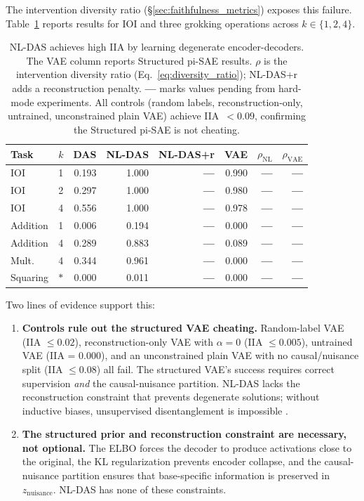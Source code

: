 \documentclass{article}
\begin{document}
The intervention diversity ratio (\S\ref{sec:faithfulness_metrics}) exposes this
failure. Table~\ref{tab:nldas_vacuous} reports results for IOI and three
grokking operations across $k \in \{1, 2, 4\}$.

\begin{table}[t]
\centering
\small
\setlength{\tabcolsep}{3pt}
\begin{tabular}{lc rrrr rr}
\toprule
Task & $k$ & DAS & NL-DAS & NL-DAS+r & VAE & $\rho_\text{NL}$ & $\rho_\text{VAE}$ \\
\midrule
IOI & 1 & 0.193 & 1.000 & \textbf{---} & 0.990 & \textbf{---} & \textbf{---} \\
IOI & 2 & 0.297 & 1.000 & \textbf{---} & 0.980 & \textbf{---} & \textbf{---} \\
IOI & 4 & 0.556 & 1.000 & \textbf{---} & 0.978 & \textbf{---} & \textbf{---} \\
Addition & 1 & 0.006 & 0.194 & \textbf{---} & 0.000 & \textbf{---} & \textbf{---} \\
Addition & 4 & 0.289 & 0.883 & \textbf{---} & 0.089 & \textbf{---} & \textbf{---} \\
Mult.\ & 4 & 0.344 & 0.961 & \textbf{---} & 0.000 & \textbf{---} & \textbf{---} \\
Squaring & $*$ & 0.000 & 0.011 & \textbf{---} & 0.000 & \textbf{---} & \textbf{---} \\
\bottomrule
\end{tabular}
\caption{NL-DAS achieves high IIA by learning degenerate encoder-decoders.
  The VAE column reports Structured pi-SAE results.
  $\rho$ is the intervention diversity ratio (Eq.~\ref{eq:diversity_ratio});
  NL-DAS+r adds a reconstruction penalty.
  \textbf{---} marks values pending from hard-mode experiments.
  All controls (random labels, reconstruction-only, untrained, unconstrained
  plain VAE) achieve IIA~$< 0.09$, confirming the Structured pi-SAE is not
  cheating.}
\label{tab:nldas_vacuous}
\end{table}

Two lines of evidence support this:

\begin{enumerate}[leftmargin=*]
\item \textbf{Controls rule out the structured VAE cheating.} Random-label VAE
  (IIA $\leq 0.02$), reconstruction-only VAE with $\alpha = 0$
  (IIA $\leq 0.005$), untrained VAE (IIA = 0.000), and an unconstrained plain
  VAE with no causal/nuisance split (IIA $\leq 0.08$) all fail. The structured
  VAE's success requires correct supervision \emph{and} the
  causal-nuisance partition. NL-DAS lacks the reconstruction constraint
  that prevents degenerate solutions; without inductive biases, unsupervised
  disentanglement is impossible \citep{locatello2019challenging}.

\item \textbf{The structured prior and reconstruction constraint are
  necessary, not optional.} The ELBO forces the decoder to produce
  activations close to the original, the KL regularization prevents
  encoder collapse, and the causal-nuisance partition ensures that
  base-specific information is preserved in $z_\text{nuisance}$.
  NL-DAS has none of these constraints.
\end{enumerate}
\end{document}
